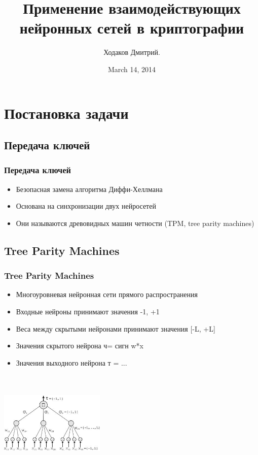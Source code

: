 \documentclass{beamer}
\title{Применение взаимодействующих нейронных сетей в криптографии}
\author{Ходаков Дмитрий.}
\date{March 14, 2014} %
\begin{document}
\frame{\titlepage}
\frame{\tableofcontents}

\section{Постановка задачи}

\subsection{Передача ключей}

\begin{frame}
\frametitle{Передача ключей}
\begin{itemize}
\item Безопасная замена алгоритма Диффи-Хеллмана
\item Основана на синхронизации двух нейросетей
\item Они называются древовидных машин четности (TPM, tree parity machines)
\end{itemize} 
\end{frame}

\subsection{Tree Parity Machines}

\begin{frame}
\frametitle{Tree Parity Machines}
\begin{itemize}
\item Многоуровневая нейронная сети прямого распространения
\item Входные нейроны принимают значения -1, +1
\item Веса между скрытыми нейронами принимают значения [-L, +L]
\item Значения скрытого нейрона ч= сигн w*x
\item Значения выходного нейрона т = ...
\end{itemize} 
\begin{center}
\includegraphics[width=5cm, height=5cm]{../../pics/tpm.jpg}
\end{center}
\end{frame}
\end{document}
